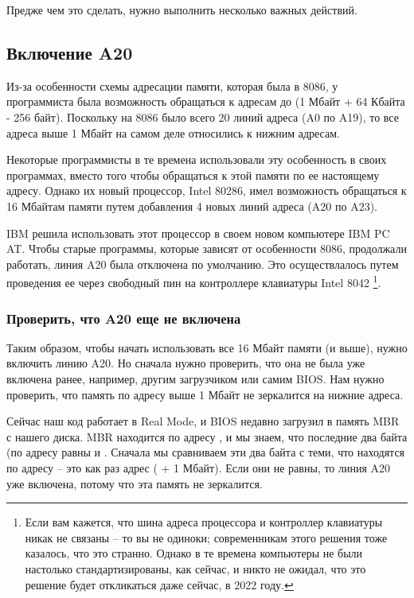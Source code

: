 \documentclass[a4page]{article}
\begin{document}
Предже чем это сделать, нужно выполнить несколько важных действий.

\subsection{Включение A20}

Из-за особенности схемы адресации памяти, которая была в 8086, у программиста была возможность обращаться
к адресам до (1 Мбайт + 64 Кбайта - 256 байт).
Поскольку на 8086 было всего 20 линий адреса (A0 по A19),
то все адреса выше 1 Мбайт на самом деле относились к нижним адресам.

Некоторые программисты в те времена использовали эту особенность в своих программах,
вместо того чтобы обращаться к этой памяти по ее настоящему адресу.
Однако их новый процессор, Intel 80286, имел возможность обращаться к 16 Мбайтам памяти путем добавления
4 новых линий адреса (A20 по A23).

IBM решила использовать этот процессор в своем новом компьютере IBM PC AT.
Чтобы старые программы, которые зависят от особенности 8086, продолжали работать,
линия A20 была отключена по умолчанию.
Это осуществлалось путем проведения ее через свободный пин на контроллере клавиатуры Intel 8042
\footnote{Если вам кажется, что шина адреса процессора и контроллер клавиатуры никак не связаны --
то вы не одиноки; современникам этого решения тоже казалось, что это странно.
Однако в те времена компьютеры не были настолько стандартизированы, как сейчас,
и никто не ожидал, что это решение будет откликаться даже сейчас, в 2022 году.}.

\subsubsection{Проверить, что A20 еще не включена}
Таким образом, чтобы начать использовать все 16 Мбайт памяти (и выше), нужно включить линию A20.
Но сначала нужно проверить, что она не была уже включена ранее, например, другим загрузчиком или самим BIOS.
Нам нужно проверить, что память по адресу выше 1 Мбайт не зеркалится на нижние адреса.

Сейчас наш код работает в Real Mode, и BIOS недавно загрузил в память MBR с нашего диска.
MBR находится по адресу , и мы знаем, что последние два байта (по адресу  равны  и .
Сначала мы сравниваем эти два байта с теми, что находятся по адресу 
-- это как раз адрес ( + 1 Мбайт).
Если они не равны, то линия A20 уже включена, потому что эта память не зеркалится.
\end{document}
